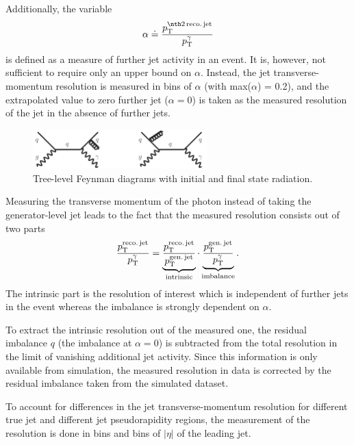 Additionally, the variable 
\begin{equation*}
\label{res:eq:alphaDef}
\alpha \doteq \frac{\ptsecondrecojet}{\ptgamma}
\end{equation*} 
is defined as a measure of further jet activity in an event. 
It is, however, not sufficient to require only an upper bound on $\alpha$. 
Instead, the jet transverse-momentum resolution is measured in bins of $\alpha$ (with max($\alpha$) = 0.2), 
and the extrapolated value to zero further jet \pt ($\alpha=0$) is taken as the measured resolution of the jet \pt in the absence of further jets.
\begin{figure}[t]
  \centering
      \includegraphics[width=0.60\textwidth]{figures/resolution/generalApproach/FeynmanDiagramsWithRadiation.pdf}
  \caption{Tree-level Feynman diagrams with initial and final state radiation.}  
  \label{res:fig:FeynmanDiagramsWithRadiation}
\end{figure}

Measuring the transverse momentum of the photon instead of taking the generator-level jet \pt leads to the fact that the measured resolution consists out of two parts
\begin{equation*}\label{res:eq:splitting}
\frac{{p}_\mathrm{T}^{\text{reco.\,jet}}}{{p}_\mathrm{T}^{\gamma}} = \underbrace{\frac{{p}_\mathrm{T}^{\text{reco.\,jet}}}{{p}_\mathrm{T}^{\text{gen.\,jet}}}}_{\text{intrinsic}} \cdot \underbrace{\frac{{p}_\mathrm{T}^{\text{gen.\,jet}}}{{p}_\mathrm{T}^{\gamma}}}_{\text{imbalance}}.
\end{equation*}
The intrinsic part is the resolution of interest which is independent of further jets in the event whereas the imbalance is strongly dependent on $\alpha$.

To extract the intrinsic resolution out of the measured one, the residual imbalance $q$ (the imbalance at $\alpha = 0$) is subtracted from the total resolution in the 
limit of vanishing additional jet activity. 
Since this information is only available from simulation, the measured resolution in data is corrected by the residual imbalance taken from the simulated dataset.

To account for differences in the jet transverse-momentum resolution for different true jet \pt and different jet pseudorapidity regions, the measurement of the resolution is done in \ptgamma bins and bins of $|\eta|$ of the leading jet.

